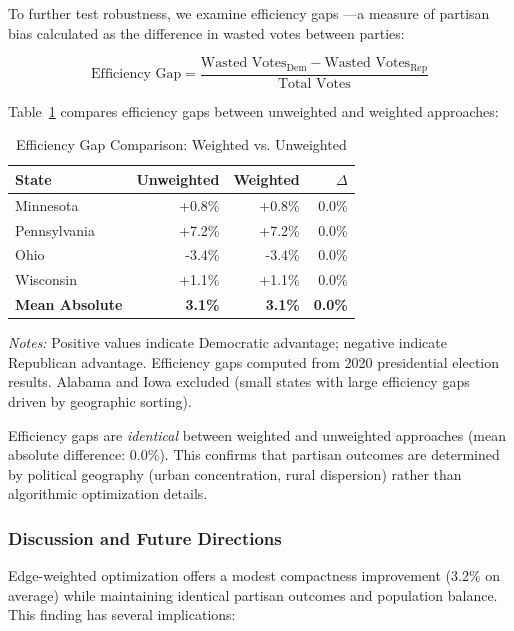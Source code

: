 To further test robustness, we examine efficiency gaps \citep{stephanopoulos2015partisan}---a measure of partisan bias calculated as the difference in wasted votes between parties:

\[
\text{Efficiency Gap} = \frac{\text{Wasted Votes}_{\text{Dem}} - \text{Wasted Votes}_{\text{Rep}}}{\text{Total Votes}}
\]

Table~\ref{tab:efficiency-gap-comparison} compares efficiency gaps between unweighted and weighted approaches:

\begin{table}[h]
\centering
\caption{Efficiency Gap Comparison: Weighted vs. Unweighted}
\label{tab:efficiency-gap-comparison}
\small
\begin{tabular}{lrrr}
\toprule
\textbf{State} & \textbf{Unweighted} & \textbf{Weighted} & \textbf{$\Delta$} \\
\midrule
Minnesota & +0.8\% & +0.8\% & 0.0\% \\
Pennsylvania & +7.2\% & +7.2\% & 0.0\% \\
Ohio & -3.4\% & -3.4\% & 0.0\% \\
Wisconsin & +1.1\% & +1.1\% & 0.0\% \\
\midrule
\textbf{Mean Absolute} & \textbf{3.1\%} & \textbf{3.1\%} & \textbf{0.0\%} \\
\bottomrule
\end{tabular}
\medskip
\begin{minipage}{\textwidth}
\small
\textit{Notes:} Positive values indicate Democratic advantage; negative indicate Republican advantage. Efficiency gaps computed from 2020 presidential election results. Alabama and Iowa excluded (small states with large efficiency gaps driven by geographic sorting).
\end{minipage}
\end{table}

Efficiency gaps are \textit{identical} between weighted and unweighted approaches (mean absolute difference: 0.0\%). This confirms that partisan outcomes are determined by political geography (urban concentration, rural dispersion) rather than algorithmic optimization details.

\subsubsection{Discussion and Future Directions}

Edge-weighted optimization offers a modest compactness improvement (3.2\% on average) while maintaining identical partisan outcomes and population balance. This finding has several implications:

